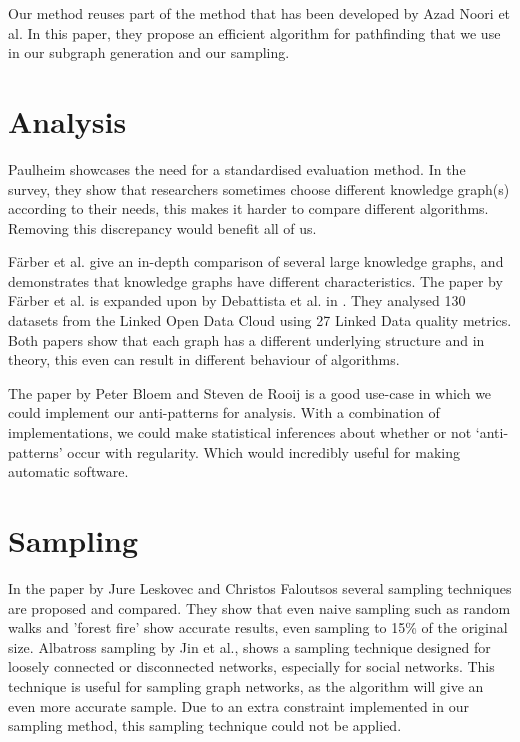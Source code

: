\documentclass[11pt,letterpaper ,oneside ]{book}
\begin{document}
	Our method reuses part of the method that has been developed by Azad Noori et al\cite{Noori:2015}. In this paper, they propose an efficient algorithm for pathfinding that we use in our subgraph generation and our sampling.
	
	\section{Analysis}
	Paulheim \cite{HeikoP:2016} showcases the need for a standardised evaluation method. In the survey, they show that researchers sometimes choose different knowledge graph(s) according to their needs, this makes it harder to compare different algorithms. Removing this discrepancy would benefit all of us.
	
	F\"arber et al. \cite{MichaelF:2017} give an in-depth comparison of several large knowledge graphs, and demonstrates that knowledge graphs have different characteristics. The paper by F\"arber et al. \cite{MichaelF:2017} is expanded upon by Debattista et al. in \cite{Debattista:2018}. They analysed 130 datasets from the Linked Open Data Cloud using 27 Linked Data quality metrics. Both papers show that each graph has a different underlying structure and in theory, this even can result in different behaviour of algorithms.
	
	The paper by Peter Bloem and Steven de Rooij\cite{BloemP:2018} is a good use-case in which we could implement our anti-patterns for analysis. With a combination of implementations, we could make statistical inferences about whether or not `anti-patterns' occur with regularity. Which would incredibly useful for making automatic software.
	
	\section{Sampling}
	In the paper by Jure Leskovec and Christos Faloutsos \cite{Leskovec:2006} several sampling techniques are proposed and compared. They show that even naive sampling such as random walks and 'forest fire' show accurate results, even sampling to 15\% of the original size. 
	Albatross sampling by Jin et al.\cite{Jin:2011}, shows a sampling technique designed for loosely connected or disconnected networks, especially for social networks. This technique is useful for sampling graph networks, as the algorithm will give an even more accurate sample. Due to an extra constraint implemented in our sampling method, this sampling technique could not be applied.
	
\end{document}
